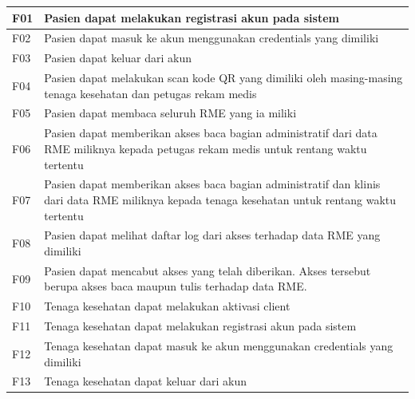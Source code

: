 \documentclass[bahasa, 12pt, a4paper, onecolumn, oneside, final]{report}
\begin{document}
\begin{longtable}{|p{0.8cm}|p{11.5cm}|}
	F01         & Pasien dapat melakukan registrasi akun pada sistem                                                                                             \\ \hline
	F02         & Pasien dapat masuk ke akun menggunakan credentials yang dimiliki                                                                               \\ \hline
	F03         & Pasien dapat keluar dari akun                                                                                                                  \\ \hline
	F04         & Pasien dapat melakukan scan kode QR yang dimiliki oleh masing-masing tenaga kesehatan dan petugas rekam medis                                  \\ \hline
	F05         & Pasien dapat membaca seluruh RME yang ia miliki                                                                                                \\ \hline
	F06         & Pasien dapat memberikan akses baca bagian administratif dari data RME miliknya kepada petugas rekam medis untuk rentang waktu tertentu         \\ \hline
	F07         & Pasien dapat memberikan akses baca bagian administratif dan klinis dari data RME miliknya kepada tenaga kesehatan untuk rentang waktu tertentu \\ \hline
	F08         & Pasien dapat melihat daftar log dari akses terhadap data RME yang dimiliki                                                                     \\ \hline
	F09         & Pasien dapat mencabut akses yang telah diberikan. Akses tersebut berupa akses baca maupun tulis terhadap data RME.                             \\ \hline
	F10         & Tenaga kesehatan dapat melakukan aktivasi client                                                                                               \\ \hline
	F11         & Tenaga kesehatan dapat melakukan registrasi akun pada sistem                                                                                   \\ \hline
	F12         & Tenaga kesehatan dapat masuk ke akun menggunakan credentials yang dimiliki                                                                     \\ \hline
	F13         & Tenaga kesehatan dapat keluar dari akun                                                                                                        \\ \hline

\end{longtable}
\end{document}
